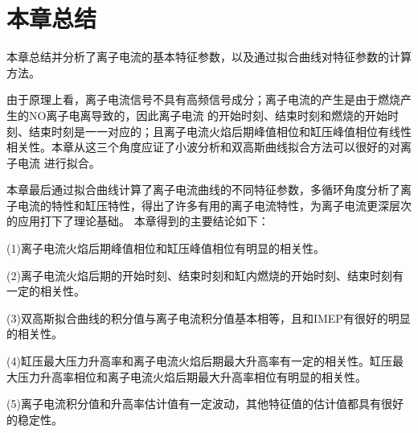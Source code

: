 \section{本章总结}
本章总结并分析了离子电流的基本特征参数，以及通过拟合曲线对特征参数的计算方法。\par
由于原理上看，离子电流信号不具有高频信号成分；离子电流的产生是由于燃烧产生的NO离子电离导致的，因此离子电流
的开始时刻、结束时刻和燃烧的开始时刻、结束时刻是一一对应的；且离子电流火焰后期峰值相位和缸压峰值相位有线性相关性。本章从这三个角度应证了小波分析和双高斯曲线拟合方法可以很好的对离子电流
进行拟合。\par
本章最后通过拟合曲线计算了离子电流曲线的不同特征参数，多循环角度分析了离子电流的特性和缸压特性，得出了许多有用的离子电流特性，为离子电流更深层次的应用打下了理论基础。
本章得到的主要结论如下：\par
(1)离子电流火焰后期峰值相位和缸压峰值相位有明显的相关性。\par
(2)离子电流火焰后期的开始时刻、结束时刻和缸内燃烧的开始时刻、结束时刻有一定的相关性。\par
(3)双高斯拟合曲线的积分值与离子电流积分值基本相等，且和IMEP有很好的明显的相关性。\par
(4)缸压最大压力升高率和离子电流火焰后期最大升高率有一定的相关性。缸压最大压力升高率相位和离子电流火焰后期最大升高率相位有明显的相关性。\par
(5)离子电流积分值和升高率估计值有一定波动，其他特征值的估计值都具有很好的稳定性。